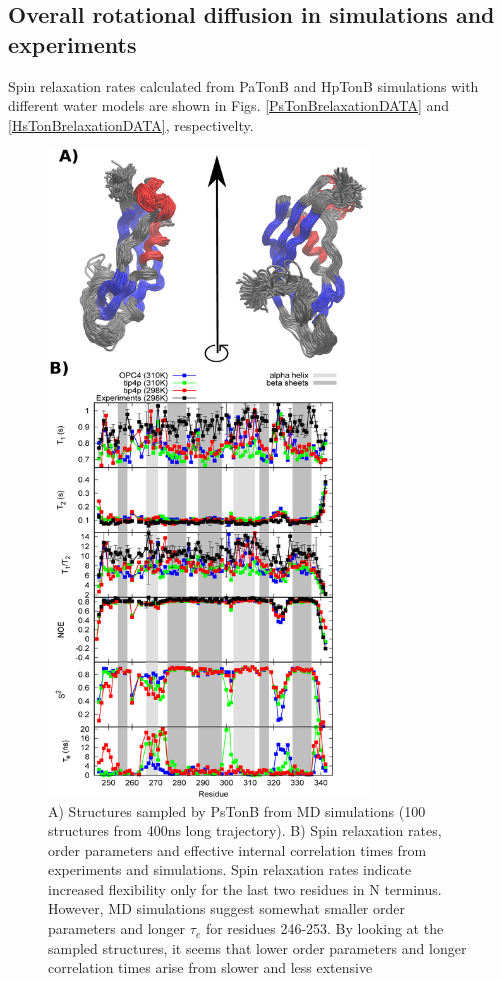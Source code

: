 \documentclass[pre,aps,floatfix,authordate1-4,twocolumn]{revtex4-1}
\begin{document}
\subsection{Overall rotational diffusion in simulations and experiments}
Spin relaxation rates calculated from PaTonB and HpTonB simulations with different
water models are shown in Figs. \ref{PsTonBrelaxationDATA} and \ref{HsTonBrelaxationDATA},
respectivelty.
\begin{figure}[!h]
  \includegraphics[width=8.5cm]{../Figs/RELdataPsTonB.eps}%
  \caption{A) Structures sampled by PsTonB from MD simulations
    (100 structures from 400ns long trajectory).
    B) Spin relaxation rates, order parameters and effective internal correlation
    times from experiments and simulations. Spin relaxation rates indicate increased flexibility
    only for the last two residues in N terminus. However,
    MD simulations suggest somewhat smaller order parameters and longer $\tau_e$
    for residues 246-253. By looking at the sampled structures, it seems that lower
    order parameters and longer correlation times arise from slower and less extensive
}
\end{figure}
\end{document}
